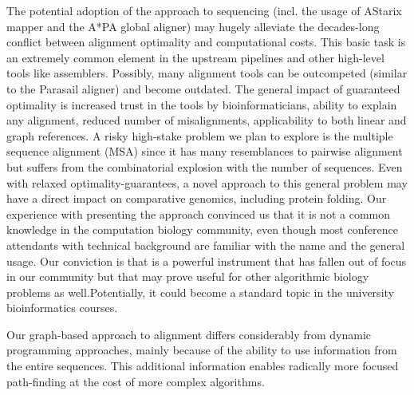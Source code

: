 The potential adoption of the \A approach to sequencing (incl. the usage of
AStarix mapper and the A*PA global aligner) may hugely alleviate the
decades-long conflict between alignment optimality and computational costs. This
basic task is an extremely common element in the upstream pipelines and other
high-level tools like assemblers. Possibly, many alignment tools can be
outcompeted (similar to the Parasail aligner) and become outdated. The general
impact of guaranteed optimality is increased trust in the tools by
bioinformaticians, ability to explain any alignment, reduced number of
misalignments, applicability to both linear and graph references. A risky
high-stake problem we plan to explore is the multiple sequence alignment (MSA)
since it has many resemblances to pairwise alignment but suffers from the
combinatorial explosion with the number of sequences. Even with relaxed
optimality-guarantees, a novel approach to this general problem may have a
direct impact on comparative genomics, including protein folding. Our experience
with presenting the \A approach convinced us that it is not a common knowledge
in the computation biology community, even though most conference attendants
with technical background are familiar with the name and the general usage. Our
conviction is that \A is a powerful instrument that has fallen out of focus in
our community but that may prove useful for other algorithmic biology problems
as well.Potentially, it could become a standard topic in the university
bioinformatics courses.

Our graph-based approach to alignment differs considerably from dynamic
programming approaches, mainly because of the ability to use information from the
entire sequences. This additional information enables radically more focused
path-finding at the cost of more complex algorithms.
